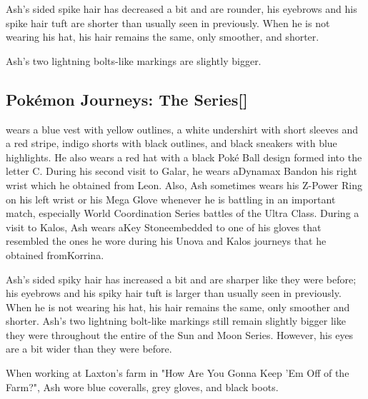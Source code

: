 \documentclass[a4paper,12pt]{article}
\begin{document}
Ash's sided spike hair has decreased a bit and are rounder, his eyebrows and his spike hair tuft are shorter than usually seen in previously. When he is not wearing his hat, his hair remains the same, only smoother, and shorter.\\ \par \vspace{0.5cm}

Ash's two lightning bolts-like markings are slightly bigger.\\ \par \vspace{0.5cm}

\subsection*{Pokémon Journeys: The Series[]}\n\nAsh wears a blue vest with yellow outlines, a white undershirt with short sleeves and a red stripe, indigo shorts with black outlines, and black sneakers with blue highlights. He also wears a red hat with a black Poké Ball design formed into the letter C. During his second visit to Galar, he wears aDynamax Bandon his right wrist which he obtained from Leon. Also, Ash sometimes wears his Z-Power Ring on his left wrist or his Mega Glove whenever he is battling in an important match, especially World Coordination Series battles of the Ultra Class. During a visit to Kalos, Ash wears aKey Stoneembedded to one of his gloves that resembled the ones he wore during his Unova and Kalos journeys that he obtained fromKorrina.\\ \par \vspace{0.5cm}

Ash's sided spiky hair has increased a bit and are sharper like they were before; his eyebrows and his spiky hair tuft is larger than usually seen in previously. When he is not wearing his hat, his hair remains the same, only smoother and shorter. Ash's two lightning bolt-like markings still remain slightly bigger like they were throughout the entire of the Sun and Moon Series. However, his eyes are a bit wider than they were before.\\ \par \vspace{0.5cm}

When working at Laxton's farm in "How Are You Gonna Keep 'Em Off of the Farm?", Ash wore blue coveralls, grey gloves, and black boots.\\ \par \vspace{0.5cm}
\end{document}
